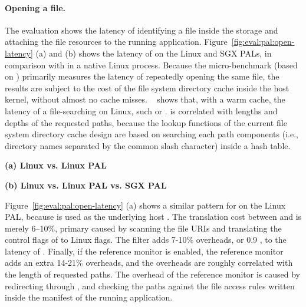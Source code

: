 \paragraph{Opening a file.}
The evaluation shows the latency of identifying a file inside the storage and attaching the file resources to the running application. 
Figure~\ref{fig:eval:pal:open-latency} (a) and (b) shows the latency of  on the Linux and SGX PALs,
in comparison with  in a native Linux process.
Because the micro-benchmark
(based on \lmbench{})
primarily measures the latency of repeatedly opening the same file, the results are subject to the cost of
the file system directory cache inside the host kernel,
without almost no cache misses.
\citeauthor{tsai15dcache}~\cite{tsai15dcache}
shows that, with a warm cache,
the latency of a file-searching \linuxapi{} on Linux,
such  or . 
is correlated with
lengths and depths of the requested paths,
because the lookup functions of the current file system directory cache design
are based on searching each path components
(i.e., directory names separated by the common slash character)
inside a hash table.

\begin{figure*}[t!]
\centering
\footnotesize
{}
\parbox{0.49\textwidth}{\centering\bf (a) Linux vs. Linux PAL}
\parbox{0.49\textwidth}{\centering\bf (b) Linux vs. Linux PAL vs. SGX PAL}
\caption{Latency of  on the Linux PAL  and SGX PAL, versus  on Linux.
Lower is better.
Figure (a) compares  on the Linux PAL,
with and without a SECCOMP filter ({\bf +SC})
and reference monitor ({\bf +RM}), against  on Linux. Figure (b) compares  on a SGX PAL,
with and without integrity checks ({\bf +CHK}),
against the Linux PAL and  on Linux.}
\label{fig:eval:pal:open-latency}
\end{figure*}

Figure~\ref{fig:eval:pal:open-latency} (a)
shows a similar pattern for 
on the Linux PAL,
because  is used as the underlying host \linuxapi{}. %
The translation cost between  and  is merely 6--10\%,
primary caused by scanning the file URIs and translating
the control flags of 
to Linux \linuxapi{} flags.
The \seccomp{} filter adds 7-10\% overheads, or \roughly{}0.9 \usec{}, to the latency of . Finally, if the reference monitor is enabled, the reference monitor adds an extra 14-21\% overheads, and the overheads are roughly correlated with the length of requested paths.
The overhead of the reference monitor
is caused by redirecting  \linuxapis{} through , and checking the paths against the file access rules written inside the manifest of the running application.  












